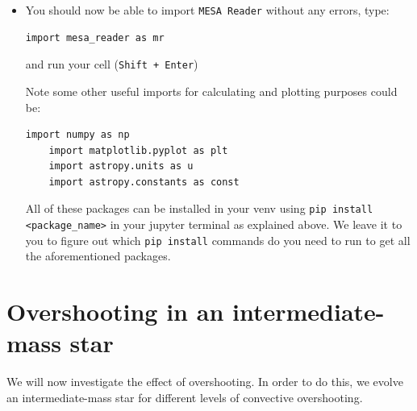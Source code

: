 \documentclass[11pt,a4paper]{article}
\begin{document}
\begin{itemize}
  \item You should now be able to import \texttt{MESA Reader} without any errors, type:
  \begin{lstlisting}[style=pythonstyle]
  import mesa_reader as mr
  \end{lstlisting}

  and run your cell (\texttt{Shift + Enter})

  Note some other useful imports for calculating and plotting purposes could be:
  \begin{lstlisting}[style=pythonstyle]
    import numpy as np
    import matplotlib.pyplot as plt
    import astropy.units as u
    import astropy.constants as const
  \end{lstlisting}

  All of these packages can be installed in your venv using \texttt{pip install <package\_name>} in your jupyter terminal as explained above. We leave it to you to figure out which \texttt{pip install} commands do you need to run to get all the aforementioned packages. 

\end{itemize}






\section{Overshooting in an intermediate-mass star}

We will now investigate the effect of overshooting. In order to do this, we evolve an intermediate-mass star for different levels of convective overshooting.
\end{document}
